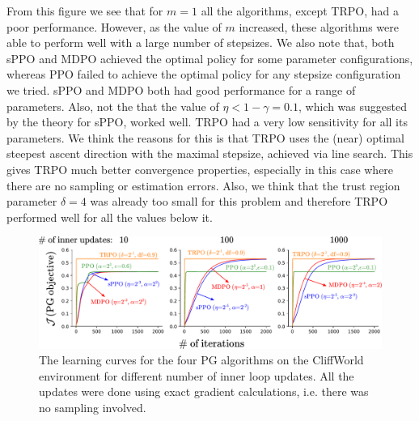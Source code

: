 \documentclass[a4paper, 10pt]{article}
\begin{document}
From this figure we see that for $m=1$ all the algorithms, except TRPO, had a poor performance. However, as the value of $m$ increased, these algorithms were able to perform well with a large number of stepsizes. We also note that, both sPPO and MDPO achieved the optimal policy for some parameter configurations, whereas PPO failed to achieve the optimal policy for any stepsize configuration we tried. sPPO and MDPO both had good performance for a range of parameters. Also, not the that the value of $\eta < 1 - \gamma = 0.1$, which was suggested by the theory for sPPO, worked well. TRPO had a very low sensitivity for all its parameters. We think the reasons for this is that TRPO uses the (near) optimal steepest ascent direction with the maximal stepsize, achieved via line search. This gives TRPO much better convergence properties, especially in this case where there are no sampling or estimation errors. Also, we think that the trust region parameter $\delta = 4$ was already too small for this problem and therefore TRPO performed well for all the values below it.
\begin{figure}[!bp]
  \centering
  \includegraphics[scale=0.6]{tabular_figures/learning_curves.pdf}
  \caption{The learning curves for the four PG algorithms on the CliffWorld environment for different number of inner loop updates. All the updates were done using exact gradient calculations, i.e. there was no sampling involved.}
  \label{fig: learning_curves}
\end{figure}
\end{document}
